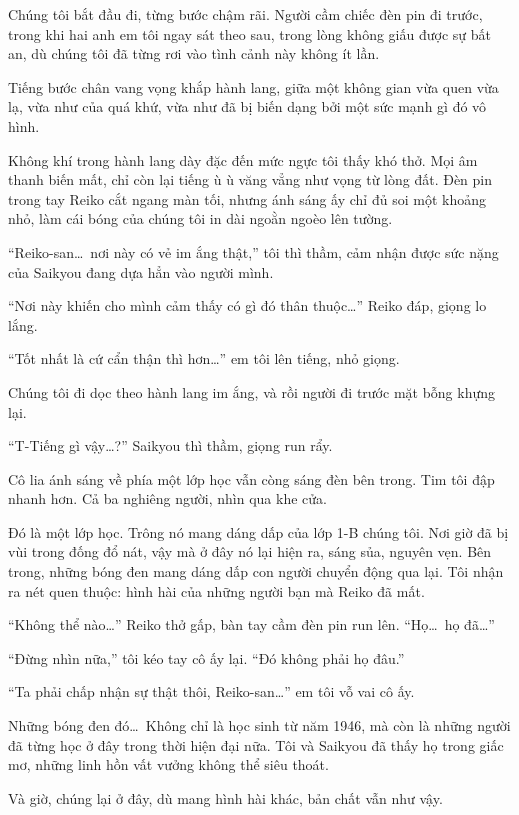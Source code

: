 \documentclass[../main.tex]{subfiles}
\begin{document}
Chúng tôi bắt đầu đi, từng bước chậm rãi. Người cầm chiếc đèn pin đi trước, trong khi hai anh em tôi ngay sát theo sau, trong lòng không giấu được sự bất an, dù chúng tôi đã từng rơi vào tình cảnh này không ít lần.

Tiếng bước chân vang vọng khắp hành lang, giữa một không gian vừa quen vừa lạ, vừa như của quá khứ, vừa như đã bị biến dạng bởi một sức mạnh gì đó vô hình.

Không khí trong hành lang dày đặc đến mức ngực tôi thấy khó thở. Mọi âm thanh biến mất, chỉ còn lại tiếng ù ù văng vẳng như vọng từ lòng đất. Đèn pin trong tay Reiko cắt ngang màn tối, nhưng ánh sáng ấy chỉ đủ soi một khoảng nhỏ, làm cái bóng của chúng tôi in dài ngoằn ngoèo lên tường.

``Reiko-san\dots\ nơi này có vẻ im ắng thật,'' tôi thì thầm, cảm nhận được sức nặng của Saikyou đang dựa hẳn vào người mình.

``Nơi này khiến cho mình cảm thấy có gì đó thân thuộc\dots'' Reiko đáp, giọng lo lắng.

``Tốt nhất là cứ cẩn thận thì hơn\dots'' em tôi lên tiếng, nhỏ giọng.

Chúng tôi đi dọc theo hành lang im ắng, và rồi người đi trước mặt bỗng khựng lại.

``T-Tiếng gì vậy\dots?'' Saikyou thì thầm, giọng run rẩy.

Cô lia ánh sáng về phía một lớp học vẫn còng sáng đèn bên trong. Tim tôi đập nhanh hơn. Cả ba nghiêng người, nhìn qua khe cửa.

Đó là một lớp học. Trông nó mang dáng dấp của lớp 1-B chúng tôi. Nơi giờ đã bị vùi trong đống đổ nát, vậy mà ở đây nó lại hiện ra, sáng sủa, nguyên vẹn. Bên trong, những bóng đen mang dáng dấp con người chuyển động qua lại. Tôi nhận ra nét quen thuộc: hình hài của những người bạn mà Reiko đã mất.

``Không thể nào\dots'' Reiko thở gấp, bàn tay cầm đèn pin run lên. ``Họ\dots\ họ đã\dots''

``Đừng nhìn nữa,'' tôi kéo tay cô ấy lại. ``Đó không phải họ đâu.''

``Ta phải chấp nhận sự thật thôi, Reiko-san\dots'' em tôi vỗ vai cô ấy.

Những bóng đen đó\dots\ Không chỉ là học sinh từ năm 1946, mà còn là những người đã từng học ở đây trong thời hiện đại nữa. Tôi và Saikyou đã thấy họ trong giấc mơ, những linh hồn vất vưởng không thể siêu thoát.

Và giờ, chúng lại ở đây, dù mang hình hài khác, bản chất vẫn như vậy.
\end{document}
